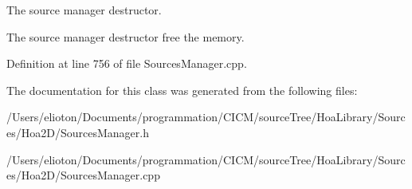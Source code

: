 The source manager destructor. 

The source manager destructor free the memory. 

Definition at line 756 of file Sources\-Manager.\-cpp.



The documentation for this class was generated from the following files\-:\begin{DoxyCompactItemize}
\item 
/\-Users/elioton/\-Documents/programmation/\-C\-I\-C\-M/source\-Tree/\-Hoa\-Library/\-Sources/\-Hoa2\-D/Sources\-Manager.\-h\item 
/\-Users/elioton/\-Documents/programmation/\-C\-I\-C\-M/source\-Tree/\-Hoa\-Library/\-Sources/\-Hoa2\-D/Sources\-Manager.\-cpp\end{DoxyCompactItemize}
